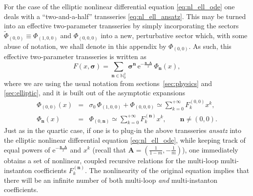 \documentclass[11pt,a4paper]{article}
\newcommand{\be}{\begin{equation}}
\newcommand{\ee}{\end{equation}}
\newcommand{\rme}{{\mathrm{e}}}
\begin{document}
For the case of the elliptic nonlinear differential equation \eqref{eq:nl_ell_ode} one deals with a ``two-and-a-half'' transseries \eqref{eq:nl_ell_ansatz}. This may be turned into an effective two-parameter transseries by simply incorporating the sectors $\widetilde{\Phi}_{(0,0)} \equiv \Phi_{(1,0,0)}$ and $\Phi_{(0,0,0)}$ into a new, perturbative sector which, with some abuse of notation, we shall denote in this appendix by $\Phi_{(0,0)}$. As such, this effective two-parameter transseries is written as
%
\be
F(x,\boldsymbol{\sigma}) = \sum_{\boldsymbol{n} \in \mathbb{N}^2_{0}}\, \boldsymbol{\sigma}^{\boldsymbol{n}}\, \rme^{-\frac{\boldsymbol{n} \cdot \boldsymbol{A}}{x}}\, \Phi_{\boldsymbol{n}} (x),
\ee
%
\noindent
where we are using the usual notation from sections~\ref{sec:physics} and \ref{sec:elliptic}, and it is built out of the asymptotic expansions 
%
\begin{eqnarray}
\Phi_{(0,0)}(x) &=& \sigma_0\, \Phi_{(1,0,0)} + \Phi_{(0,0,0)} \simeq \sum_{k=0}^{+\infty} F_k^{(0,0)} x^k, \\
\Phi_{\boldsymbol{n}}(x) &=& \Phi_{(0,\boldsymbol{n})} \simeq \sum_{k=0}^{+\infty} F_k^{(\boldsymbol{n})} x^k, \qquad \boldsymbol{n}\ne(0,0).
\end{eqnarray}
%
\noindent
Just as in the quartic case, if one is to plug-in the above transseries \textit{ansatz} into the elliptic nonlinear differential equation \eqref{eq:nl_ell_ode}, while keeping track of equal powers of $\rme^{-\frac{\boldsymbol{n} \cdot \boldsymbol{A}}{x}}$ and $x^k$ (recall that $\boldsymbol{A} = \left( \frac{1}{1-m}, -\frac{1}{m} \right)$), one immediately obtains a set of nonlinear, coupled recursive relations for the multi-loop multi-instanton coefficients $F_k^{(\boldsymbol{n})}$. The nonlinearity of the original equation implies that there will be an infinite number of both multi-loop \textit{and} multi-instanton coefficients.
\end{document}
